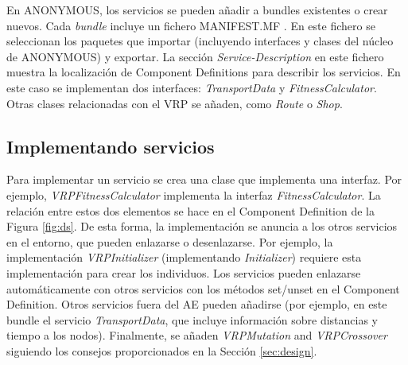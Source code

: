 \documentclass[runningheads]{llncs}
\begin{document}
En ANONYMOUS, los servicios se pueden añadir a bundles existentes o crear nuevos. Cada {\em bundle} incluye un fichero MANIFEST.MF . En este fichero se seleccionan los paquetes que importar (incluyendo interfaces y clases del núcleo de ANONYMOUS) y exportar. La sección {\em Service-Description} en este fichero muestra la localización de Component Definitions para describir los servicios. En este caso se implementan dos interfaces: {\em TransportData} y {\em FitnessCalculator}. Otras clases relacionadas con el VRP se añaden, como {\em Route} o {\em Shop}.


\subsection{Implementando servicios}
Para implementar un servicio se crea una clase que implementa una interfaz. Por ejemplo,  {\em VRPFitnessCalculator} implementa la interfaz {\em FitnessCalculator}. La relación entre estos dos elementos se hace en el Component Definition de la Figura \ref{fig:ds}. De esta forma, la implementación se anuncia a los otros servicios en el entorno, que pueden enlazarse o desenlazarse. Por ejemplo, la implementación {\em VRPInitializer} (implementando {\em Initializer}) requiere esta implementación para crear los individuos. Los servicios pueden enlazarse automáticamente con otros servicios con los métodos set/unset en el Component Definition. Otros servicios fuera del AE pueden añadirse (por ejemplo, en este bundle el servicio {\em TransportData}, que incluye información sobre distancias y tiempo a los nodos). Finalmente, se añaden {\em VRPMutation} and {\em VRPCrossover} siguiendo los consejos proporcionados en la Sección \ref{sec:design}.
\end{document}
